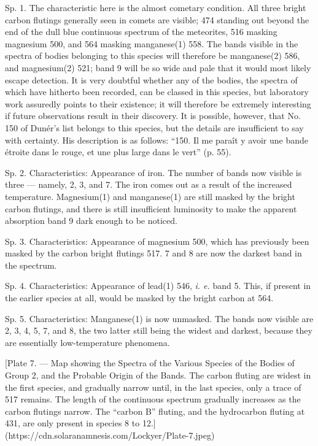 \documentclass[a4paper, 12pt, oneside, polutonikogreek, english]{article}
\begin{document}
Sp. 1. The characteristic here is the almost cometary condition. All three bright carbon flutings generally seen in comets are visible; 474 standing out beyond the end of the dull blue continuous spectrum of the meteorites, 516 masking magnesium 500, and 564 masking manganese(1) 558. The bands visible in the spectra of bodies belonging to this species will therefore be manganese(2) 586, and magnesium(2) 521; band 9 will be so wide and pale that it would most likely escape detection. It is very doubtful whether any of the bodies, the spectra of which have hitherto been recorded, can be classed in this species, but laboratory work assuredly points to their existence; it will therefore be extremely interesting if future observations result in their discovery. It is possible, however, that No. 150 of Dunér's list belongs to this species, but the details are insufficient to say with certainty. His description is as follows: ``150. Il me paraît y avoir une bande étroite dans le rouge, et une plus large dans le vert'' (p. 55).

Sp. 2. Characteristics: Appearance of iron. The number of bands now visible is three --- namely, 2, 3, and 7. The iron comes out as a result of the increased temperature. Magnesium(1) and manganese(1) are still masked by the bright carbon flutings, and there is still insufficient luminosity to make the apparent absorption band 9 dark enough to be noticed.

Sp. 3. Characteristics: Appearance of magnesium 500, which has previously been masked by the carbon bright flutings 517. 7 and 8 are now the darkest band in the spectrum.

Sp. 4. Characteristics: Appearance of lead(1) 546, \emph{i. e.} band 5. This, if present in the earlier species at all, would be masked by the bright carbon at 564.

Sp. 5. Characteristics: Manganese(1) is now unmasked. The bands now visible are 2, 3, 4, 5, 7, and 8, the two latter still being the widest and darkest, because they are essentially low-temperature phenomena.

[Plate 7. --- Map showing the Spectra of the Various Species of the Bodies of Group 2, and the Probable Origin of the Bands. The carbon fluting are widest in the first species, and gradually narrow until, in the last species, only a trace of 517 remains. The length of the continuous spectrum gradually increases as the carbon flutings narrow. The ``carbon B'' fluting, and the hydrocarbon fluting at 431, are only present in species 8 to 12.](https://cdn.solaranamnesis.com/Lockyer/Plate-7.jpeg)
\end{document}
